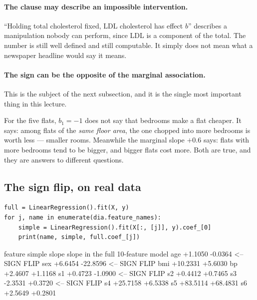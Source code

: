 \documentclass[11pt]{article}
\begin{document}
\paragraph{The clause may describe an impossible intervention.} ``Holding
total cholesterol fixed, LDL cholesterol has effect $b$'' describes a
manipulation nobody can perform, since LDL is a component of the total. The
number is still well defined and still computable. It simply does not mean
what a newspaper headline would say it means.

\paragraph{The sign can be the opposite of the marginal association.} This is
the subject of the next subsection, and it is the single most important thing
in this lecture.

For the five flats, $b_1 = -1$ does not say that bedrooms make a flat cheaper.
It says: among flats of the \emph{same floor area}, the one chopped into more
bedrooms is worth less --- smaller rooms. Meanwhile the marginal slope
$+0.6$ says: flats with more bedrooms tend to be bigger, and bigger flats cost
more. Both are true, and they are answers to different questions.

\subsection{The sign flip, on real data}
\label{sec:signflip}

\begin{lstlisting}
full = LinearRegression().fit(X, y)
for j, name in enumerate(dia.feature_names):
    simple = LinearRegression().fit(X[:, [j]], y).coef_[0]
    print(name, simple, full.coef_[j])
\end{lstlisting}
\begin{codeout}
feature   simple slope   slope in the full 10-feature model
age            +1.1050                -0.0364  <-- SIGN FLIP
sex            +6.6454               -22.8596  <-- SIGN FLIP
bmi           +10.2331                +5.6030
bp             +2.4607                +1.1168
s1             +0.4723                -1.0900  <-- SIGN FLIP
s2             +0.4412                +0.7465
s3             -2.3531                +0.3720  <-- SIGN FLIP
s4            +25.7158                +6.5338
s5            +83.5114               +68.4831
s6             +2.5649                +0.2801
\end{codeout}
\end{document}
